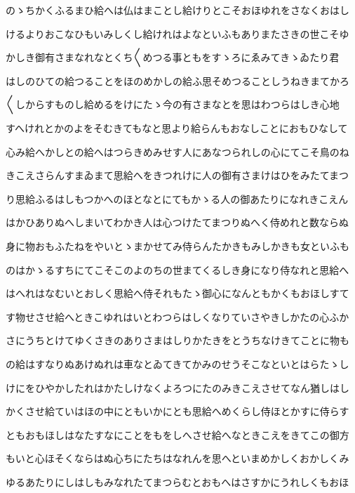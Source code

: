 \documentclass[a4paper,11pt,landscape]{ltjtarticle}
\begin{document}
のゝちかくふるまひ給へは仏はまことし給けりとこそおほゆれをさなくおはし
\par\medskip
けるよりおこなひもいみしくし給けれはよなといふもありまたさきの世こそゆ
\par\medskip
かしき御有さまなれなとくち〱めつる事ともをすゝろにゑみてきゝゐたり君
\par\medskip
はしのひての給つることをほのめかしの給ふ思そめつることしうねきまてかろ
\par\medskip
〱しからすものし給めるをけにたゝ今の有さまなとを思はわつらはしき心地
\par\medskip
すへけれとかのよをそむきてもなと思より給らんもおなしことにおもひなして
\par\medskip
心み給へかしとの給へはつらきめみせす人にあなつられしの心にてこそ鳥のね
\par\medskip
きこえさらんすまゐまて思給へをきつれけに人の御有さまけはひをみたてまつ
\par\medskip
り思給ふるはしもつかへのほとなとにてもかゝる人の御あたりになれきこえん
\par\medskip
はかひありぬへしまいてわかき人は心つけたてまつりぬへく侍めれと数ならぬ
\par\medskip
身に物おもふたねをやいとゝまかせてみ侍らんたかきもみしかきも女といふも
\par\medskip
のはかゝるすちにてこそこのよのちの世まてくるしき身になり侍なれと思給へ
\par\medskip
はへれはなむいとおしく思給へ侍それもたゝ御心になんともかくもおほしすて
\par\medskip
す物せさせ給へときこゆれはいとわつらはしくなりていさやきしかたの心ふか
\par\medskip
さにうちとけてゆくさきのありさまはしりかたきをとうちなけきてことに物も
\par\medskip
の給はすなりぬあけぬれは車なとゐてきてかみのせうそこなといとはらたゝし
\par\medskip
けにをひやかしたれはかたしけなくよろつにたのみきこえさせてなん猶しはし
\par\medskip
かくさせ給ていはほの中にともいかにとも思給へめくらし侍ほとかすに侍らす
\par\medskip
ともおもほしはなたすなにことをもをしへさせ給へなときこえをきてこの御方
\par\medskip
もいと心ほそくならはぬ心ちにたちはなれんを思へといまめかしくおかしくみ
\par\medskip
ゆるあたりにしはしもみなれたてまつらむとおもへはさすかにうれしくもおほ
\par\medskip
\end{document}
